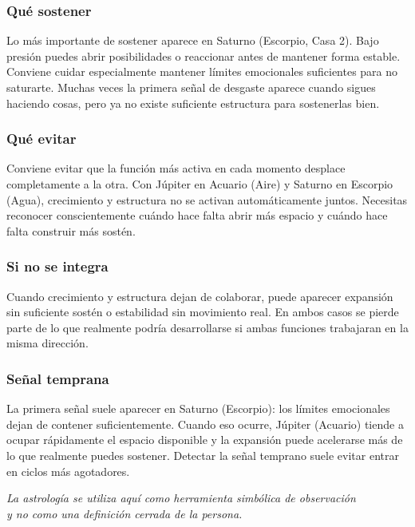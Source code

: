 \documentclass[11pt,a4paper]{article}
\begin{document}
\subsubsection*{Qué sostener}

Lo más importante de sostener aparece en Saturno (Escorpio, Casa 2). Bajo presión puedes abrir posibilidades o reaccionar antes de mantener forma estable. Conviene cuidar especialmente mantener límites emocionales suficientes para no saturarte. Muchas veces la primera señal de desgaste aparece cuando sigues haciendo cosas, pero ya no existe suficiente estructura para sostenerlas bien.

\subsubsection*{Qué evitar}

Conviene evitar que la función más activa en cada momento desplace completamente a la otra. Con Júpiter en Acuario (Aire) y Saturno en Escorpio (Agua), crecimiento y estructura no se activan automáticamente juntos. Necesitas reconocer conscientemente cuándo hace falta abrir más espacio y cuándo hace falta construir más sostén.

\subsubsection*{Si no se integra}

Cuando crecimiento y estructura dejan de colaborar, puede aparecer expansión sin suficiente sostén o estabilidad sin movimiento real. En ambos casos se pierde parte de lo que realmente podría desarrollarse si ambas funciones trabajaran en la misma dirección.

\subsubsection*{Señal temprana}

La primera señal suele aparecer en Saturno (Escorpio): los límites emocionales dejan de contener suficientemente. Cuando eso ocurre, Júpiter (Acuario) tiende a ocupar rápidamente el espacio disponible y la expansión puede acelerarse más de lo que realmente puedes sostener. Detectar la señal temprano suele evitar entrar en ciclos más agotadores.

\vfill

\begin{center}
{\small\itshape\color{grisai}
La astrología se utiliza aquí como herramienta simbólica de observación\\
y no como una definición cerrada de la persona.
}
\end{center}
\end{document}
